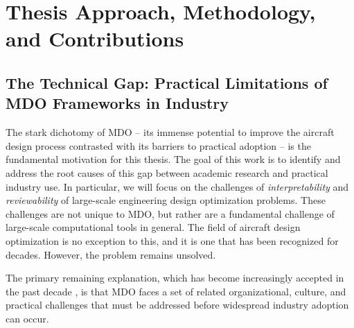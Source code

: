 \documentclass[12pt,vi,oneside]{report}
\begin{document}
    \chapter{Thesis Approach, Methodology, and Contributions}
    \label{sec:approach}


    \section{The Technical Gap: Practical Limitations of MDO Frameworks in Industry}
    \label{sec:technical-gap}

    The stark dichotomy of MDO -- its immense potential to improve the aircraft design process contrasted with its barriers to practical adoption -- is the fundamental motivation for this thesis. The goal of this work is to identify and address the root causes of this gap between academic research and practical industry use. In particular, we will focus on the challenges of \textit{interpretability} and \textit{reviewability} of large-scale engineering design optimization problems. These challenges are not unique to MDO, but rather are a fundamental challenge of large-scale computational tools in general. The field of aircraft design optimization is no exception to this, and it is one that has been recognized for decades. However, the problem remains unsolved.


    The primary remaining explanation, which has become increasingly accepted in the past decade \cite{agte_mdo_2010, torenbeek_advanced_2013, gazaix_industrialization_2017, gpkit}, is that MDO faces a set of related organizational, culture, and practical challenges that must be addressed before widespread industry adoption can occur.
\end{document}
